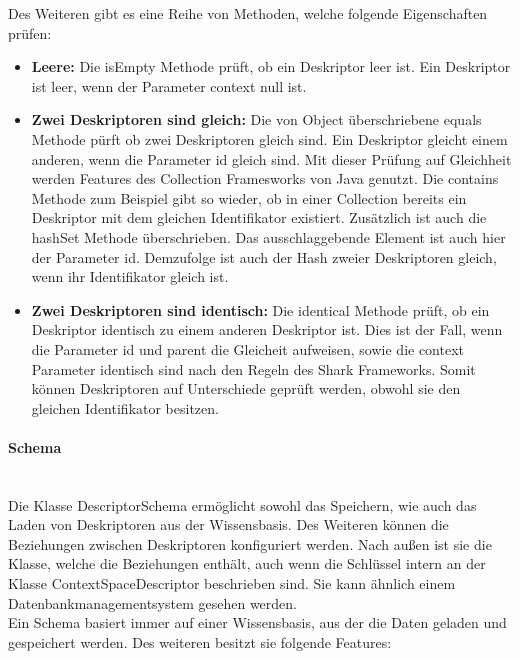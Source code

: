 \documentclass[a4paper]{article}
\begin{document}
	Des Weiteren gibt es eine Reihe von Methoden, welche folgende Eigenschaften
	prüfen:
	
	\begin{itemize}
		\item \textbf{Leere:} Die isEmpty Methode prüft, ob ein Deskriptor
		leer ist. Ein Deskriptor ist leer, wenn der Parameter context null ist.
		\item \textbf{Zwei Deskriptoren sind gleich:} Die von Object überschriebene
		equals Methode pürft ob zwei Deskriptoren gleich sind. Ein Deskriptor
		gleicht einem anderen, wenn die Parameter id gleich sind. Mit dieser
		Prüfung	auf Gleichheit werden Features des Collection Framesworks 
		von Java genutzt. Die contains Methode zum Beispiel gibt so wieder, ob
		in einer Collection bereits ein Deskriptor mit dem gleichen Identifikator
		existiert. Zusätzlich ist auch die hashSet Methode überschrieben. Das
		ausschlaggebende Element ist auch hier der Parameter id. Demzufolge
		ist auch der Hash zweier Deskriptoren gleich, wenn ihr Identifikator 
		gleich ist.
		\item \textbf{Zwei Deskriptoren sind identisch:} Die identical Methode
		prüft, ob ein Deskriptor identisch zu einem anderen Deskriptor ist. Dies
		ist der Fall, wenn die Parameter id und parent die Gleicheit aufweisen,
		sowie die context Parameter identisch sind nach den Regeln des Shark
		Frameworks. Somit können Deskriptoren auf Unterschiede geprüft werden,
		obwohl sie den gleichen Identifikator besitzen.
	\end{itemize}
	
	\paragraph{Schema}\mbox{} \\
	
	Die Klasse DescriptorSchema ermöglicht sowohl das Speichern, wie auch das
	Laden von Deskriptoren aus der Wissensbasis. Des Weiteren können die
	Beziehungen	zwischen Deskriptoren konfiguriert werden.
	Nach außen ist sie die Klasse, welche die Beziehungen enthält, auch wenn die
	Schlüssel intern an der Klasse ContextSpaceDescriptor beschrieben sind. Sie kann
	ähnlich einem Datenbankmanagementsystem gesehen werden. \\
	
	Ein Schema basiert immer auf einer Wissensbasis, aus der die Daten geladen und
	gespeichert werden. Des weiteren besitzt sie folgende Features:
	
\end{document}
